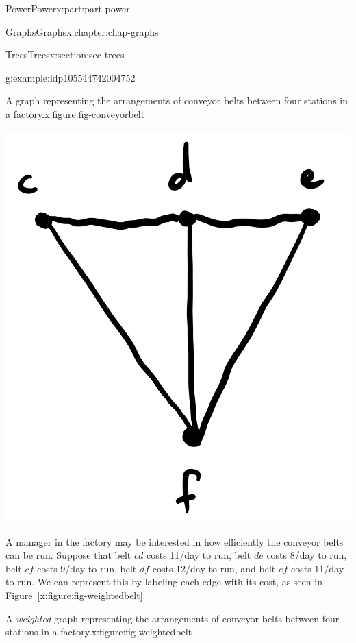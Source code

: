 \documentclass[oneside,10pt,]{book}
\newcommand{\xreffont}{\relax}
\numberwithin{equation}{section}
\begin{document}
\begin{partptx}{Power}{}{Power}{}{}{x:part:part-power}
\begin{chapterptx}{Graphs}{}{Graphs}{}{}{x:chapter:chap-graphs}
\begin{sectionptx}{Trees}{}{Trees}{}{}{x:section:sec-trees}
\begin{example}{}{g:example:idp105544742004752}
\begin{figureptx}{A graph representing the arrangements of conveyor belts between four stations in a factory.}{x:figure:fig-conveyorbelt}{}
\begin{image}{0.25}{0.5}{0.25}
\includegraphics[width=\linewidth]{images/graph06.png}
\end{image}%
\tcblower
\end{figureptx}%
A manager in the factory may be interested in how efficiently the conveyor belts can be run. Suppose that belt \(cd\) costs \textdollar{}11\slash{}day to run, belt \(de\) costs \textdollar{}8\slash{}day to run, belt \(cf\) costs \textdollar{}9\slash{}day to run, belt \(df\) costs \textdollar{}12\slash{}day to run, and belt \(ef\) costs \textdollar{}11\slash{}day to run. We can represent this by labeling each edge with its cost, as seen in \hyperref[x:figure:fig-weightedbelt]{Figure~{\xreffont\ref{x:figure:fig-weightedbelt}}}.%
\begin{figureptx}{A \emph{weighted} graph representing the arrangements of conveyor belts between four stations in a factory.}{x:figure:fig-weightedbelt}{}%
\begin{image}{0.25}{0.5}{0.25}%

\end{image}
\end{figureptx}
\end{example}
\end{sectionptx}
\end{chapterptx}
\end{partptx}
\end{document}
